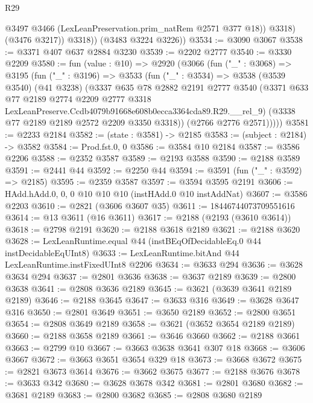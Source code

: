 \begin{lexlean}{R29}
\begin{coremodule}
                @3497
                @3466
                (LexLeanPreservation.prim_natRem @2571 @377 @18))
              @3318)
            (@3476 @3217))
          @3318))
      (@3483 @3224 @3226))
@3534 := @3090 @3067
@3538 := @3371 @407 @637 @2884 @3230
@3539 := @2202 @2777
@3540 := @3330 @2209
@3580 := fun (value : @10) =>
  @2920
    (@3066
      (fun ("_" : @3068) =>
      @3195
        (fun ("_" : @3196) =>
        @3533
          (fun ("_" : @3534) =>
          @3538
            (@3539 @3540)
            (@41 @3238)
            (@3337
              @635
              @78
              @2882
              @2191
              @2777
              @3540
              (@3371
                @633
                @77
                @2189
                @2774
                @2209
                @2777
                @3318
                LexLeanPreserve.Ccdb4079b91668e608b0ecca3364cda89.R29.__rel_9)
              (@3338 @77 @2189 @2189 @2572 @2209 @3350 @3318))
            (@2766 @2776 @2571)))))
@3581 := @2233 @2184
@3582 := (state : @3581) -> @2185
@3583 := (subject : @2184) -> @3582
@3584 := Prod.fst.{0, 0}
@3586 := @3584 @10 @2184
@3587 := @3586 @2206
@3588 := @2352 @3587
@3589 := @2193 @3588
@3590 := @2188 @3589
@3591 := @2441 @44
@3592 := @2250 @44
@3594 := @3591 (fun ("_" : @3592) => @2185)
@3595 := @2359 @3587
@3597 := @3594 @3595 @2191
@3606 := HAdd.hAdd.{0, 0, 0} @10 @10 @10 (instHAdd.{0} @10 instAddNat)
@3607 := @3586 @2203
@3610 := @2821 (@3606 @3607 @35)
@3611 := 18446744073709551616
@3614 := @13 @3611 (@16 @3611)
@3617 := @2188 (@2193 (@3610 @3614))
@3618 := @2798 @2191
@3620 := @2188 @3618 @2189
@3621 := @2188 @3620
@3628 := LexLeanRuntime.equal @44 (instBEqOfDecidableEq.{0} @44 instDecidableEqUInt8)
@3633 := LexLeanRuntime.bitAnd @44 LexLeanRuntime.instFixedUInt8 @2206
@3634 := @3633 @294
@3636 := @3628 @3634 @294
@3637 := @2801 @3636
@3638 := @3637 @2189
@3639 := @2800 @3638
@3641 := @2808 @3636 @2189
@3645 := @3621 (@3639 @3641 @2189 @2189)
@3646 := @2188 @3645
@3647 := @3633 @316
@3649 := @3628 @3647 @316
@3650 := @2801 @3649
@3651 := @3650 @2189
@3652 := @2800 @3651
@3654 := @2808 @3649 @2189
@3658 := @3621 (@3652 @3654 @2189 @2189)
@3660 := @2188 @3658 @2189
@3661 := @3646 @3660
@3662 := @2188 @3661
@3663 := @2799 @10
@3667 := @3663 @3638 @3641 @307 @18
@3668 := @3606 @3667
@3672 := @3663 @3651 @3654 @329 @18
@3673 := @3668 @3672
@3675 := @2821 @3673 @3614
@3676 := @3662 @3675
@3677 := @2188 @3676
@3678 := @3633 @342
@3680 := @3628 @3678 @342
@3681 := @2801 @3680
@3682 := @3681 @2189
@3683 := @2800 @3682
@3685 := @2808 @3680 @2189

\end{coremodule}
\end{lexlean}

